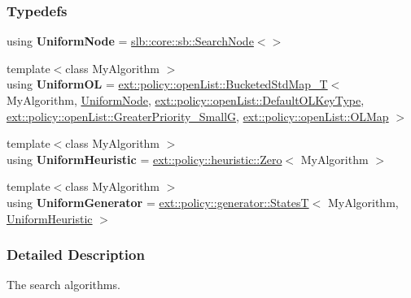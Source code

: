 \subsubsection*{Typedefs}
\begin{DoxyCompactItemize}
\item 
using {\bfseries Uniform\+Node} = \hyperlink{structslb_1_1core_1_1sb_1_1SearchNode}{slb\+::core\+::sb\+::\+Search\+Node}$<$$>$\hypertarget{namespaceslb_1_1ext_1_1algorithm_a697c5839a166be7cc9cd7fc3c2b15f98}{}\label{namespaceslb_1_1ext_1_1algorithm_a697c5839a166be7cc9cd7fc3c2b15f98}

\item 
{\footnotesize template$<$class My\+Algorithm $>$ }\\using {\bfseries Uniform\+OL} = \hyperlink{structslb_1_1ext_1_1policy_1_1openList_1_1BucketedStdMap__T}{ext\+::policy\+::open\+List\+::\+Bucketed\+Std\+Map\+\_\+T}$<$ My\+Algorithm, \hyperlink{structslb_1_1core_1_1sb_1_1SearchNode}{Uniform\+Node}, \hyperlink{structslb_1_1ext_1_1policy_1_1openList_1_1DefaultOLKeyType}{ext\+::policy\+::open\+List\+::\+Default\+O\+L\+Key\+Type}, \hyperlink{structslb_1_1ext_1_1policy_1_1openList_1_1GreaterPriority__SmallG}{ext\+::policy\+::open\+List\+::\+Greater\+Priority\+\_\+\+SmallG}, \hyperlink{namespaceslb_1_1ext_1_1policy_1_1openList_ae328455bada2886ad728a9f54bfa1f6a}{ext\+::policy\+::open\+List\+::\+O\+L\+Map} $>$\hypertarget{namespaceslb_1_1ext_1_1algorithm_aebb91df5b56955857d898d76d9ca5873}{}\label{namespaceslb_1_1ext_1_1algorithm_aebb91df5b56955857d898d76d9ca5873}

\item 
{\footnotesize template$<$class My\+Algorithm $>$ }\\using {\bfseries Uniform\+Heuristic} = \hyperlink{structslb_1_1ext_1_1policy_1_1heuristic_1_1Zero}{ext\+::policy\+::heuristic\+::\+Zero}$<$ My\+Algorithm $>$\hypertarget{namespaceslb_1_1ext_1_1algorithm_a4df6bd68a037486451c16445cb78d21f}{}\label{namespaceslb_1_1ext_1_1algorithm_a4df6bd68a037486451c16445cb78d21f}

\item 
{\footnotesize template$<$class My\+Algorithm $>$ }\\using {\bfseries Uniform\+Generator} = \hyperlink{structslb_1_1ext_1_1policy_1_1generator_1_1StatesT}{ext\+::policy\+::generator\+::\+StatesT}$<$ My\+Algorithm, \hyperlink{structslb_1_1ext_1_1policy_1_1heuristic_1_1Zero}{Uniform\+Heuristic} $>$\hypertarget{namespaceslb_1_1ext_1_1algorithm_afe2eae9c2d224b1677a1e95c013c13b4}{}\label{namespaceslb_1_1ext_1_1algorithm_afe2eae9c2d224b1677a1e95c013c13b4}

\end{DoxyCompactItemize}


\subsubsection{Detailed Description}
The search algorithms. 